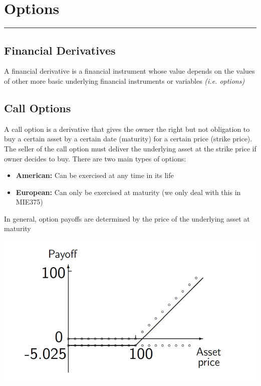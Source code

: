 \documentclass[11pt]{article}
\begin{document}
\section{Options}
\hrule \vspace{15pt}

\subsection{Financial Derivatives}
A financial derivative is a financial instrument whose value depends on the values of other more basic underlying financial instruments or variables \textit{(i.e. options)}
\subsection{Call Options}
A call option is a derivative that gives the owner the right but not obligation to buy a certain asset by a certain date (maturity) for a certain price (strike price). The seller of the call option must deliver the underlying asset at the strike price if owner decides to buy.  There are two main types of options: 
\begin{itemize}
\item \textbf{American:} Can be exercised at any time in its life
\item \textbf{European:} Can only be exercised at maturity (we only deal with this in MIE375) 
\end{itemize}
In general, option payoffs are determined by the price of the underlying asset at maturity
\begin{center}
\includegraphics[scale=0.4]{images/call.png} 
\end{center}
\end{document}
